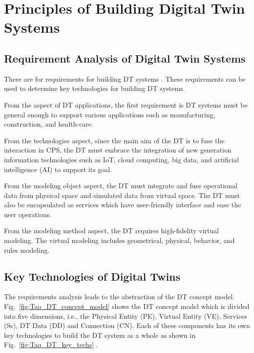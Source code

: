 \documentclass[article,table]{aaltoseries}
\begin{document}

\section{Principles of Building Digital Twin Systems}
\subsection{Requirement Analysis of Digital Twin Systems}
There are for requirements for building DT systems \cite{Tao2019}. These requirements can be used to determine key technologies for building DT systems.

From the aspect of DT applications, the first requirement is DT systems must be general enough to support various applications such as manufacturing, construction, and health-care.

From the technologies aspect, since the main aim of the DT is to fuse the interaction in CPS, the DT must embrace the integration of new generation information technologies such as IoT, cloud computing, big data, and artificial intelligence (AI) to support its goal.

From the modeling object aspect, the DT must integrate and fuse operational data from physical space and simulated data from virtual space. The DT must also be encapsulated as services which have user-friendly interface and ease the user operations.

From the modeling method aspect, the DT requires high-fidelity virtual modeling. The virtual modeling includes geometrical, physical, behavior, and rules modeling.

\subsection{Key Technologies of Digital Twins}
The requirements analysis leads to the abstraction of the DT concept model. Fig.~\ref{fig:Tao_DT_concept_model} shows the DT concept model which is divided into five dimensions, i.e., the Physical Entity (PE), Virtual Entity (VE), Services (Ss), DT Data (DD) and Connection (CN). Each of these components has its own key technologies to build the DT system as a whole as shown in Fig.~\ref{fig:Tao_DT_key_techs} \cite{Tao2019}.
\end{document}
